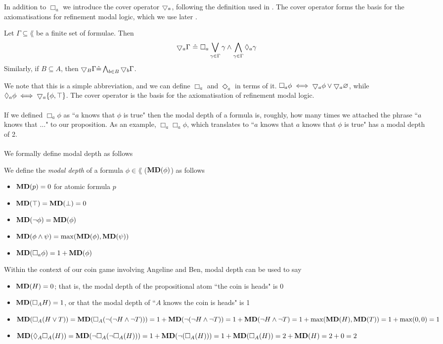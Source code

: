 In addition to $\Box_a$ we introduce the cover operator $\bigtriangledown_a$, following the definition used in
\cite{venemaproofsystems}.
The cover operator forms the basis for the axiomatisations for refinement modal logic, which we use
later \cite{hales2012refinement}.

\begin{defn} \label{coverDef}
Let $\Gamma \subseteq \lang$ be a finite set of formulae.
Then
\[
	\bigtriangledown_a \Gamma \text{ } \hat{=} \text{ } \Box_a \bigvee_{\gamma \in \Gamma} \gamma \land
  \bigwedge_{\gamma \in \Gamma} \Diamond_a \gamma
\]
Similarly, if $B \subseteq A$, then $\bigtriangledown_B \Gamma \hat{=} \bigwedge_{b \in B}
\bigtriangledown_b \Gamma$.
\end{defn}
We note that this is a simple abbreviation, and we can define $\Box_a$ and
$\Diamond_a$ in terms of it.
$\Box_a \phi \iff \bigtriangledown_a \phi \lor \bigtriangledown_a \varnothing$, while $\Diamond_a
\phi \iff \bigtriangledown_a \{\phi, \top\}$.
The cover operator is the basis for the axiomatisation of refinement modal logic.\\
\\
If we defined $\Box_a \phi$ as ``$a$ knows that $\phi$ is true" then the modal depth of a formula is, roughly,
how many times we attached the phrase ``$a$ knows that $\ldots$" to our proposition.
As an example, $\Box_a \Box_a \phi$, which translates to ``$a$ knows that $a$ knows that $\phi$ is
true" has a modal depth of 2.\\
\\
We formally define modal depth as follows

\begin{defn} \label{modalDepth}
We define the {\em modal depth} of a formula $\phi \in \lang$ (${\bf MD}(\phi)$) as follows
\begin{itemize}
	\item ${\bf MD}(p) = 0$ for atomic formula $p$
	\item ${\bf MD}(\top) = {\bf MD}(\bot) = 0$
	\item ${\bf MD}(\neg \phi) = {\bf MD}(\phi)$
	\item ${\bf MD}(\phi \land \psi) = \max({\bf MD}(\phi), {\bf MD}(\psi))$
	\item ${\bf MD}(\Box_a \phi) = 1 + {\bf MD}(\phi)$
\end{itemize}
\end{defn}

Within the context of our coin game involving Angeline and Ben, modal depth can be used to say
\begin{itemize}
	\item ${\bf MD}(H) = 0$; that is, the modal depth of the propositional atom ``the coin is heads" is 0
	\item ${\bf MD}(\Box_A H) = 1$, or that the modal depth of ``$A$ knows the coin is heads" is 1
	\item ${\bf MD}(\Box_A (H \lor T)) = {\bf MD}(\Box_A(\neg(\neg H \land \neg T))) = 1 + {\bf MD}(\neg(\neg H
		\land \neg T)) = 1 + {\bf MD}(\neg H \land \neg T) = 1 + \max({\bf MD}(H),{\bf MD}(T)) = 1 + \max(0,0) = 1$
	\item ${\bf MD}(\Diamond_A \Box_A (H)) = {\bf MD}(\neg \Box_A (\neg \Box_A (H))) = 1 + {\bf MD}(\neg(\Box_A(H)))
		= 1 + {\bf MD}(\Box_A(H)) = 2 + {\bf MD}(H) = 2 + 0 =  2$
\end{itemize}

